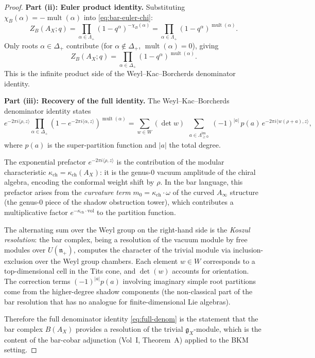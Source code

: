 \documentclass[11pt]{amsart}
\theoremstyle{definition}
\theoremstyle{remark}
\DeclareMathOperator{\mult}{mult}
\newcommand{\fg}{\mathfrak{g}}
\newcommand{\fn}{\mathfrak{n}}
\begin{document}
\begin{proof}
\medskip
\noindent\textbf{Part (ii): Euler product identity.}
Substituting $\chi_B(\alpha) = -\mult(\alpha)$ into
\eqref{eq:bar-euler-chi}:
\[
 Z_B(A_X; q) = \prod_{\alpha \in \Lambda_+}
 (1 - q^\alpha)^{-\chi_B(\alpha)}
 = \prod_{\alpha \in \Lambda_+}
 (1 - q^\alpha)^{\mult(\alpha)}.
\]
Only roots $\alpha \in \Delta_+$ contribute (for
$\alpha \notin \Delta_+$, $\mult(\alpha) = 0$), giving
\[
 Z_B(A_X; q) = \prod_{\alpha \in \Delta_+}
 (1 - q^\alpha)^{\mult(\alpha)}.
\]
This is the infinite product side of the Weyl--Kac--Borcherds
denominator identity.

\medskip
\noindent\textbf{Part (iii): Recovery of the full identity.}
The Weyl--Kac--Borcherds denominator identity states
\[
 e^{-2\pi i \langle \rho, z \rangle}
 \prod_{\alpha \in \Delta_+}
 (1 - e^{-2\pi i \langle \alpha, z \rangle})^{\mult(\alpha)}
 = \sum_{w \in W} (\det w)\,
 \sum_{\substack{a \in \Lambda^{\mathrm{im}}_{\geq 0}}}
 (-1)^{|a|}\, p(a)\,
 e^{-2\pi i \langle w(\rho + a), z \rangle},
\]
where $p(a)$ is the super-partition function and
$|a|$ the total degree.

The exponential prefactor
$e^{-2\pi i \langle \rho, z \rangle}$ is the contribution
of the modular characteristic $\kappa_{\mathrm{ch}} = \kappa_{\mathrm{ch}}(A_X)$:
it is the genus-$0$ vacuum amplitude of the chiral algebra,
encoding the conformal weight shift by $\rho$. In the bar
language, this prefactor arises from the \emph{curvature term}
$m_0 = \kappa_{\mathrm{ch}} \cdot \omega$ of the curved $A_\infty$ structure
(the genus-$0$ piece of the shadow obstruction tower), which contributes
a multiplicative factor $e^{-\kappa_{\mathrm{ch}} \cdot \mathrm{vol}}$ to
the partition function.

The alternating sum over the Weyl group on the right-hand side
is the \emph{Koszul resolution}: the bar complex, being a
resolution of the vacuum module by free modules over
$U(\fn_+)$, computes the character of the trivial module via
inclusion-exclusion over the Weyl group chambers. Each
element $w \in W$ corresponds to a top-dimensional cell
in the Tits cone, and $\det(w)$ accounts for orientation.
The correction terms $(-1)^{|a|} p(a)$ involving imaginary
simple root partitions come from the higher-degree shadow
components (the non-classical part of the bar resolution that
has no analogue for finite-dimensional Lie algebras).

Therefore the full denominator identity
\eqref{eq:full-denom} is the statement that the bar complex
$B(A_X)$ provides a resolution of the trivial $\fg_X$-module,
which is the content of the bar-cobar adjunction (Vol~I,
Theorem~A) applied to the BKM setting.
\end{proof}
\end{document}
